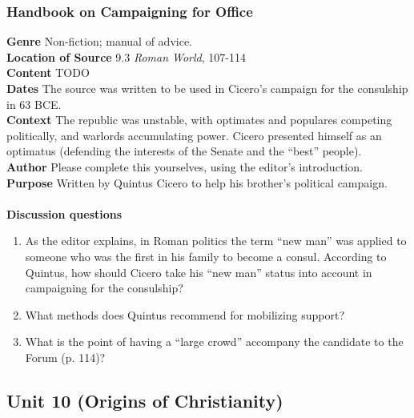 \documentclass{article}
\begin{document}
\subsubsection*{Handbook on Campaigning for Office}
\textbf{Genre}
Non-fiction; manual of advice. \\
\textbf{Location of Source}
9.3 \textit{Roman World}, 107-114 \\
\textbf{Content}
TODO \\
\textbf{Dates}
The source was written to be used in Cicero’s campaign for the consulship in 63 BCE. \\
\textbf{Context}
The republic was unstable, with optimates and populares competing politically, and warlords accumulating power. Cicero presented himself as an optimatus (defending the interests of the Senate and the “best” people). \\
\textbf{Author}
Please complete this yourselves, using the editor’s introduction. \\
\textbf{Purpose}
Written by Quintus Cicero to help his brother’s political campaign. \\
\\
\textbf{Discussion questions}
\begin{enumerate}
  \item As the editor explains, in Roman politics the term “new man” was applied to someone who was the first in his family to become a consul. According to Quintus, how should Cicero take his “new man” status into account in campaigning for the consulship?
  \item What methods does Quintus recommend for mobilizing support?
  \item What is the point of having a “large crowd” accompany the candidate to the Forum (p. 114)?
\end{enumerate}
\subsection*{Unit 10 (Origins of Christianity)}
\end{document}
